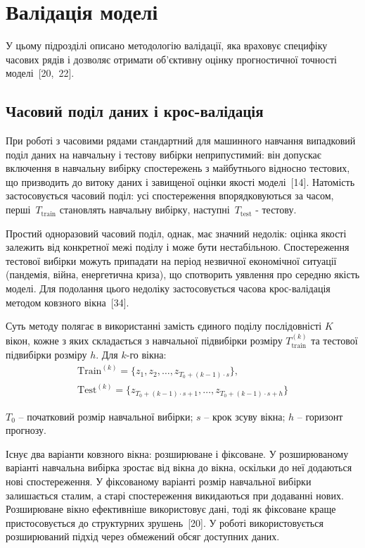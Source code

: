 \documentclass{bachelor_thesis}
\begin{document}
\section{Валідація моделі}

У цьому підрозділі описано методологію валідації, яка враховує специфіку часових рядів і дозволяє отримати об'єктивну оцінку прогностичної точності моделі~[20,~22].

\subsection{Часовий поділ даних і крос-валідація}

При роботі з часовими рядами стандартний для машинного навчання випадковий поділ даних на навчальну і тестову вибірки неприпустимий: він допускає включення в навчальну вибірку спостережень з майбутнього відносно тестових, що призводить до витоку даних і завищеної оцінки якості моделі~[14]. Натомість застосовується часовий поділ: усі спостереження впорядковуються за часом, перші~$T_{\text{train}}$ становлять навчальну вибірку, наступні~$T_{\text{test}}$ - тестову.

Простий одноразовий часовий поділ, однак, має значний недолік: оцінка якості залежить від конкретної межі поділу і може бути нестабільною. Спостереження тестової вибірки можуть припадати на період незвичної економічної ситуації (пандемія, війна, енергетична криза), що спотворить уявлення про середню якість моделі. Для подолання цього недоліку застосовується часова крос-валідація методом ковзного вікна~[34].

Суть методу полягає в використанні замість єдиного поділу послідовністі $K$ вікон, кожне з яких складається з навчальної підвибірки розміру $T_{\text{train}}^{(k)}$ та тестової підвибірки розміру $h$. Для $k$-го вікна:
\begin{gather*}
\text{Train}^{(k)} = \{z_1, z_2, \ldots, z_{T_0 + (k-1) \cdot s}\}, \\
\text{Test}^{(k)} = \{z_{T_0 + (k-1) \cdot s + 1}, \ldots, z_{T_0 + (k-1) \cdot s + h}\}
\end{gather*}

 $T_0$ -- початковий розмір навчальної вибірки; $s$ -- крок зсуву вікна; $h$ -- горизонт прогнозу.

Існує два варіанти ковзного вікна: розширюване і фіксоване. У розширюваному варіанті навчальна вибірка зростає від вікна до вікна, оскільки до неї додаються нові спостереження. У фіксованому варіанті розмір навчальної вибірки залишається сталим, а старі спостереження викидаються при додаванні нових. Розширюване вікно ефективніше використовує дані, тоді як фіксоване краще пристосовується до структурних зрушень~[20]. У роботі використовується розширюваний підхід через обмежений обсяг доступних даних.
\end{document}
